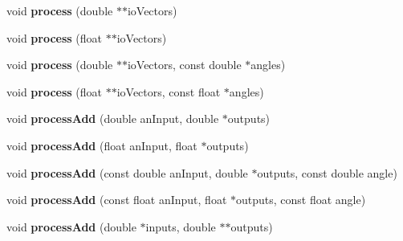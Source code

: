 \begin{DoxyCompactItemize}
\item 
\hypertarget{class_ambisonic_encoder_a532898a94b09bfb762728ec67fde9e1d}{void {\bfseries process} (double $\ast$$\ast$io\-Vectors)}\label{class_ambisonic_encoder_a532898a94b09bfb762728ec67fde9e1d}

\item 
\hypertarget{class_ambisonic_encoder_aca5238899e21e0dbc0a240eef3c02794}{void {\bfseries process} (float $\ast$$\ast$io\-Vectors)}\label{class_ambisonic_encoder_aca5238899e21e0dbc0a240eef3c02794}

\item 
\hypertarget{class_ambisonic_encoder_a5bf20ae2218da44a417e63c50131b1f8}{void {\bfseries process} (double $\ast$$\ast$io\-Vectors, const double $\ast$angles)}\label{class_ambisonic_encoder_a5bf20ae2218da44a417e63c50131b1f8}

\item 
\hypertarget{class_ambisonic_encoder_ab6a26ca6f602a4c6d3cad2ca550a6390}{void {\bfseries process} (float $\ast$$\ast$io\-Vectors, const float $\ast$angles)}\label{class_ambisonic_encoder_ab6a26ca6f602a4c6d3cad2ca550a6390}

\item 
\hypertarget{class_ambisonic_encoder_a4f7c402511070a39f3085515be5c760f}{void {\bfseries process\-Add} (double an\-Input, double $\ast$outputs)}\label{class_ambisonic_encoder_a4f7c402511070a39f3085515be5c760f}

\item 
\hypertarget{class_ambisonic_encoder_a619e62fbe756e4bdf11b080ed0b45c2f}{void {\bfseries process\-Add} (float an\-Input, float $\ast$outputs)}\label{class_ambisonic_encoder_a619e62fbe756e4bdf11b080ed0b45c2f}

\item 
\hypertarget{class_ambisonic_encoder_a707b6c0a4d8d613318c825d386df5104}{void {\bfseries process\-Add} (const double an\-Input, double $\ast$outputs, const double angle)}\label{class_ambisonic_encoder_a707b6c0a4d8d613318c825d386df5104}

\item 
\hypertarget{class_ambisonic_encoder_ae0729e857acb4664577d0dc4ae3fafbc}{void {\bfseries process\-Add} (const float an\-Input, float $\ast$outputs, const float angle)}\label{class_ambisonic_encoder_ae0729e857acb4664577d0dc4ae3fafbc}

\item 
\hypertarget{class_ambisonic_encoder_ac0f9d046314326a3b464223566d7370f}{void {\bfseries process\-Add} (double $\ast$inputs, double $\ast$$\ast$outputs)}\label{class_ambisonic_encoder_ac0f9d046314326a3b464223566d7370f}


\end{DoxyCompactItemize}
